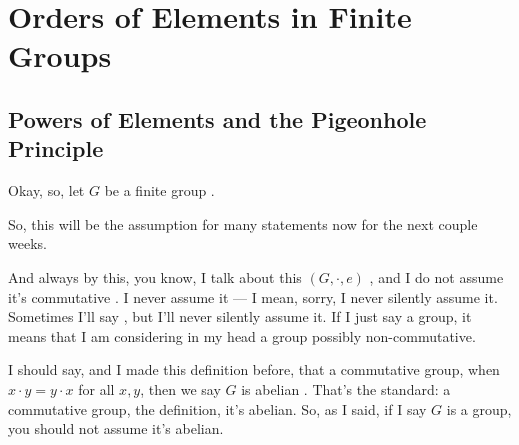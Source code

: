 \section{Orders of Elements in Finite Groups}

\subsection{Powers of Elements and the Pigeonhole Principle}

\begin{speech}[01:18:11 - 01:19:33]
Okay, so, let $G$ be a finite group .

So, this will be the assumption for many statements now for the next couple weeks.

And always by this, you know, I talk about this $(G, \cdot, e)$ , and I do not assume it's commutative . I never assume it --- I mean, sorry, I never silently assume it. Sometimes I'll say , but I'll never silently assume it. If I just say a group, it means that I am considering in my head a group possibly non-commutative.

I should say, and I made this definition before, that a commutative group, when $x \cdot y = y \cdot x$ for all $x, y$, then we say $G$ is abelian . That's the standard: a commutative group, the definition, it's abelian. So, as I said, if I say $G$ is a group, you should not assume it's abelian.
\end{speech}

\begin{content}
\end{content}

